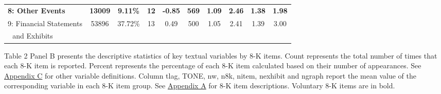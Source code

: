 \begin{table}[H]
\begin{center}
\begin{tabular}{lccccccccc}
  		\textbf{8: Other Events} & \textbf{13009} & \textbf{9.11\%} & \textbf{12} & \textbf{-0.85} & \textbf{569} & \textbf{1.09} & \textbf{2.46} & \textbf{1.38} & \textbf{1.98} \\
  		9: Financial Statements & 53896 & 37.72\% & 13 & 0.49 & 500 & 1.05 & 2.41 & 1.39 & 3.00 \\
  		\: \,\, and Exhibits & &  &  &  & & & & & \\
  		\bottomrule
  		\bottomrule
  	\end{tabular}%
  \end{center}
	\begin{footnotesize}
		\noindent Table 2 Panel B presents the descriptive statistics of key textual variables by 8-K items. Count represents the total number of times that each 8-K item is reported. Percent represents the percentage of each 8-K item calculated based on their number of appearances. See \hyperref[appc]{Appendix C} for other variable definitions. Column tlag, TONE, nw, n8k, nitem, nexhibit and ngraph report the mean value of the corresponding variable in each 8-K item group. See \hyperref[appa]{Appendix A} for 8-K item descriptions. Voluntary 8-K items are in bold.
	\end{footnotesize}
\end{table}%
